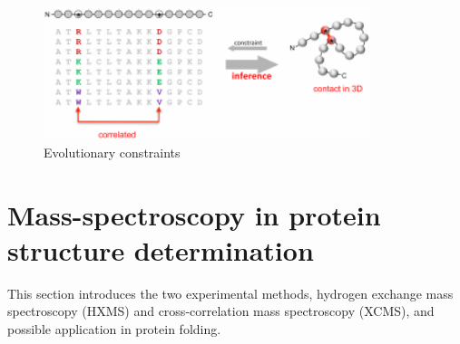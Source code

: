 % 
% 
% 




\begin{figure}
    \centering
    \includegraphics[width=0.85\textwidth]{figures/evo_constraint.pdf}
    \caption{Evolutionary constraints}
    \label{fig:evo_constraint}
\end{figure}



\chapter{Mass-spectroscopy in protein structure determination}

This section introduces the two experimental methods, hydrogen exchange mass spectroscopy (HXMS) and cross-correlation mass spectroscopy (XCMS), and possible application in protein folding.

